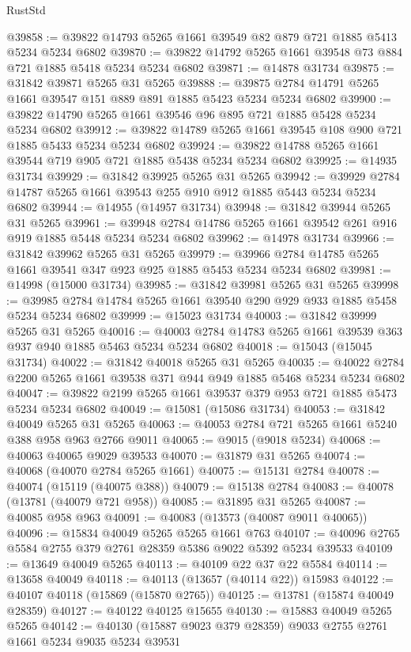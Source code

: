 \begin{lexlean}{RustStd}
\begin{coremodule}
@39858 := @39822 @14793 @5265 @1661 @39549 @82 @879 @721 @1885 @5413 @5234 @5234 @6802
@39870 := @39822 @14792 @5265 @1661 @39548 @73 @884 @721 @1885 @5418 @5234 @5234 @6802
@39871 := @14878 @31734
@39875 := @31842 @39871 @5265 @31 @5265
@39888 := @39875 @2784 @14791 @5265 @1661 @39547 @151 @889 @891 @1885 @5423 @5234 @5234 @6802
@39900 := @39822 @14790 @5265 @1661 @39546 @96 @895 @721 @1885 @5428 @5234 @5234 @6802
@39912 := @39822 @14789 @5265 @1661 @39545 @108 @900 @721 @1885 @5433 @5234 @5234 @6802
@39924 := @39822 @14788 @5265 @1661 @39544 @719 @905 @721 @1885 @5438 @5234 @5234 @6802
@39925 := @14935 @31734
@39929 := @31842 @39925 @5265 @31 @5265
@39942 := @39929 @2784 @14787 @5265 @1661 @39543 @255 @910 @912 @1885 @5443 @5234 @5234 @6802
@39944 := @14955 (@14957 @31734)
@39948 := @31842 @39944 @5265 @31 @5265
@39961 := @39948 @2784 @14786 @5265 @1661 @39542 @261 @916 @919 @1885 @5448 @5234 @5234 @6802
@39962 := @14978 @31734
@39966 := @31842 @39962 @5265 @31 @5265
@39979 := @39966 @2784 @14785 @5265 @1661 @39541 @347 @923 @925 @1885 @5453 @5234 @5234 @6802
@39981 := @14998 (@15000 @31734)
@39985 := @31842 @39981 @5265 @31 @5265
@39998 := @39985 @2784 @14784 @5265 @1661 @39540 @290 @929 @933 @1885 @5458 @5234 @5234 @6802
@39999 := @15023 @31734
@40003 := @31842 @39999 @5265 @31 @5265
@40016 := @40003 @2784 @14783 @5265 @1661 @39539 @363 @937 @940 @1885 @5463 @5234 @5234 @6802
@40018 := @15043 (@15045 @31734)
@40022 := @31842 @40018 @5265 @31 @5265
@40035 := @40022 @2784 @2200 @5265 @1661 @39538 @371 @944 @949 @1885 @5468 @5234 @5234 @6802
@40047 := @39822 @2199 @5265 @1661 @39537 @379 @953 @721 @1885 @5473 @5234 @5234 @6802
@40049 := @15081 (@15086 @31734)
@40053 := @31842 @40049 @5265 @31 @5265
@40063 := @40053 @2784 @721 @5265 @1661 @5240 @388 @958 @963 @2766 @9011
@40065 := @9015 (@9018 @5234)
@40068 := @40063 @40065 @9029 @39533
@40070 := @31879 @31 @5265
@40074 := @40068 (@40070 @2784 @5265 @1661)
@40075 := @15131 @2784
@40078 := @40074 (@15119 (@40075 @388))
@40079 := @15138 @2784
@40083 := @40078 (@13781 (@40079 @721 @958))
@40085 := @31895 @31 @5265
@40087 := @40085 @958 @963
@40091 := @40083 (@13573 (@40087 @9011 @40065))
@40096 := @15834 @40049 @5265 @5265 @1661 @763
@40107 := @40096 @2765 @5584 @2755 @379 @2761 @28359 @5386 @9022 @5392 @5234 @39533
@40109 := @13649 @40049 @5265
@40113 := @40109 @22 @37 @22 @5584
@40114 := @13658 @40049
@40118 := @40113 (@13657 (@40114 @22)) @15983
@40122 := @40107 @40118 (@15869 (@15870 @2765))
@40125 := @13781 (@15874 @40049 @28359)
@40127 := @40122 @40125 @15655
@40130 := @15883 @40049 @5265 @5265
@40142 := @40130 (@15887 @9023 @379 @28359) @9033 @2755 @2761 @1661 @5234 @9035 @5234 @39531

\end{coremodule}
\end{lexlean}
